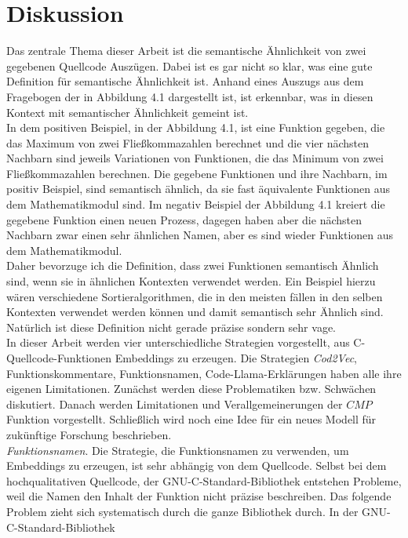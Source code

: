 \documentclass[12pt,letterpaper,ngerman]{article}
\begin{document}
\section{Diskussion}
Das zentrale Thema dieser Arbeit ist die semantische Ähnlichkeit
von zwei gegebenen Quellcode Auszügen. Dabei ist es gar nicht 
so klar,
was eine gute Definition für semantische Ähnlichkeit ist.
Anhand eines Auszugs aus dem Fragebogen der in Abbildung 4.1
dargestellt ist, ist erkennbar,
was in diesen Kontext mit semantischer Ähnlichkeit gemeint ist.\\
In dem positiven Beispiel, in der Abbildung 4.1, ist eine Funktion
gegeben, die das Maximum von zwei Fließkommazahlen berechnet und die
vier
nächsten Nachbarn sind jeweils Variationen von Funktionen, die das
Minimum von zwei Fließkommazahlen berechnen. Die 
gegebene Funktionen und ihre Nachbarn, im positiv Beispiel, sind 
semantisch ähnlich, da sie fast äquivalente Funktionen aus dem
Mathematikmodul sind. Im negativ Beispiel der Abbildung 4.1 kreiert
die gegebene Funktion einen neuen Prozess, dagegen haben aber die 
nächsten Nachbarn zwar einen sehr ähnlichen Namen, aber es sind 
wieder Funktionen aus dem Mathematikmodul.\\
Daher bevorzuge ich die Definition, dass zwei Funktionen semantisch
Ähnlich sind, wenn sie in ähnlichen Kontexten verwendet werden. 
Ein Beispiel hierzu wären verschiedene Sortieralgorithmen, die in 
den meisten fällen in den selben Kontexten verwendet werden können 
und damit semantisch sehr Ähnlich sind. Natürlich ist diese 
Definition nicht gerade präzise sondern sehr vage.\\
In dieser Arbeit werden vier unterschiedliche Strategien
vorgestellt, aus C-Quellcode-Funktionen Embeddings zu erzeugen.
Die Strategien \textit{Cod2Vec}, Funktionskommentare, 
Funktionsnamen, Code-Llama-Erklärungen haben alle ihre 
eigenen Limitationen. Zunächst werden diese Problematiken
bzw. Schwächen diskutiert. Danach werden Limitationen 
und Verallgemeinerungen der $CMP$ Funktion vorgestellt.
Schließlich wird noch eine Idee für ein neues Modell 
für zukünftige Forschung beschrieben.
\pagebreak\\
\textit{Funktionsnamen}. Die Strategie, die Funktionsnamen zu 
verwenden, um Embeddings zu erzeugen, ist sehr abhängig von 
dem Quellcode. Selbst bei dem hochqualitativen Quellcode, 
der GNU-C-Standard-Bibliothek entstehen Probleme, weil die 
Namen den Inhalt der Funktion nicht präzise beschreiben.
Das folgende Problem zieht sich systematisch durch die 
ganze Bibliothek durch. In der GNU-C-Standard-Bibliothek
\end{document}
